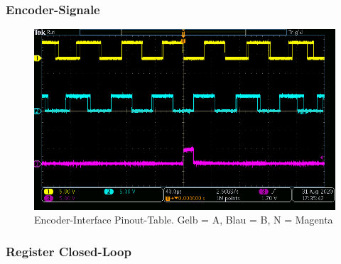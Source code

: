 \subsubsection{Encoder-Signale}\label{Appendix:ABN_Signale}

\begin{figure}[H]
	\centering
	\includegraphics[width=\textwidth]{graphics/AMT322S-V_Signal}
	\caption{Encoder-Interface Pinout-Table. Gelb = A, Blau = B, N = Magenta}
	\label{fig:AMT322S-V_Signal}
\end{figure}


\subsubsection{Register Closed-Loop}\label{Appendix:ABN_Register}

